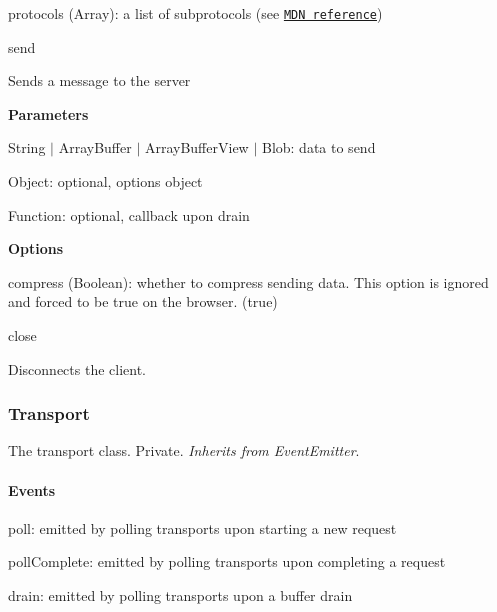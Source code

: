 \begin{DoxyItemize}
\begin{DoxyItemize}
\begin{DoxyItemize}
\item {\ttfamily protocols} ({\ttfamily Array})\+: a list of subprotocols (see \href{https://developer.mozilla.org/en-US/docs/Web/API/WebSockets_API/Writing_WebSocket_servers#Subprotocols}{\tt M\+DN reference})
\end{DoxyItemize}
\end{DoxyItemize}
\item {\ttfamily send}
\begin{DoxyItemize}
\item Sends a message to the server
\item {\bfseries Parameters}
\begin{DoxyItemize}
\item {\ttfamily String} $\vert$ {\ttfamily Array\+Buffer} $\vert$ {\ttfamily Array\+Buffer\+View} $\vert$ {\ttfamily Blob}\+: data to send
\item {\ttfamily Object}\+: optional, options object
\item {\ttfamily Function}\+: optional, callback upon {\ttfamily drain}
\end{DoxyItemize}
\item {\bfseries Options}
\begin{DoxyItemize}
\item {\ttfamily compress} ({\ttfamily Boolean})\+: whether to compress sending data. This option is ignored and forced to be {\ttfamily true} on the browser. ({\ttfamily true})
\end{DoxyItemize}
\end{DoxyItemize}
\item {\ttfamily close}
\begin{DoxyItemize}
\item Disconnects the client.
\end{DoxyItemize}
\end{DoxyItemize}

\subsubsection*{Transport}

The transport class. Private. {\itshape Inherits from Event\+Emitter}.

\paragraph*{Events}


\begin{DoxyItemize}
\item {\ttfamily poll}\+: emitted by polling transports upon starting a new request
\item {\ttfamily poll\+Complete}\+: emitted by polling transports upon completing a request
\item {\ttfamily drain}\+: emitted by polling transports upon a buffer drain
\end{DoxyItemize}


